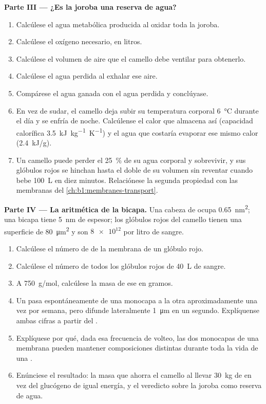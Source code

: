 \begin{problem}
\medskip
\noindent\textbf{Parte III --- ¿Es la joroba una reserva de agua?}
\begin{enumerate}[resume]
  \item Calcúlese el agua metabólica producida al oxidar toda la joroba.
  \item Calcúlese el oxígeno necesario, en litros.
  \item Calcúlese el volumen de aire que el camello debe ventilar para
        obtenerlo.
  \item Calcúlese el agua perdida al exhalar ese aire.
  \item Compárese el agua ganada con el agua perdida y conclúyase.
  \item En vez de sudar, el camello deja subir su temperatura corporal
        \qty{6}{\celsius} durante el día y se enfría de noche. Calcúlense
        el calor que almacena así (capacidad calorífica
        \qty{3.5}{kJ.kg^{-1}.K^{-1}}) y el agua que costaría evaporar ese
        mismo calor (\qty{2.4}{kJ/g}).
  \item Un camello puede perder el \qty{25}{\%} de su agua corporal y
        sobrevivir, y sus glóbulos rojos se hinchan hasta el doble de su
        volumen sin reventar cuando bebe \qty{100}{L} en diez minutos.
        Relaciónese la segunda propiedad con las membranas del
        \cref{ch:b1:membranes-transport}.
\end{enumerate}

\medskip
\noindent\textbf{Parte IV --- La aritmética de la bicapa.}
Una cabeza de  ocupa \qty{0.65}{nm^2}; una bicapa tiene
\qty{5}{nm} de espesor; los glóbulos rojos del camello tienen una superficie
de \qty{80}{\micro m^2} y son $\num{8e12}$ por litro de sangre.
\begin{enumerate}[resume]
  \item Calcúlese el número de  de la membrana de un glóbulo
        rojo.
  \item Calcúlese el número de todos los glóbulos rojos de \qty{40}{L} de
        sangre.
  \item A \qty{750}{g/mol}, calcúlese la masa de ese  en gramos.
  \item Un  pasa espontáneamente de una monocapa a la otra
        aproximadamente una vez por semana, pero difunde lateralmente
        \qty{1}{\micro m} en un segundo. Explíquense ambas cifras a partir
        del .
  \item Explíquese por qué, dada esa frecuencia de volteo, las dos
        monocapas de una membrana pueden mantener composiciones distintas
        durante toda la vida de una .
  \item Enúnciese el resultado: la masa que ahorra el camello al llevar
        \qty{30}{kg} de  en vez del glucógeno de igual energía, y el
        veredicto sobre la joroba como reserva de agua.
\end{enumerate}
\end{problem}
